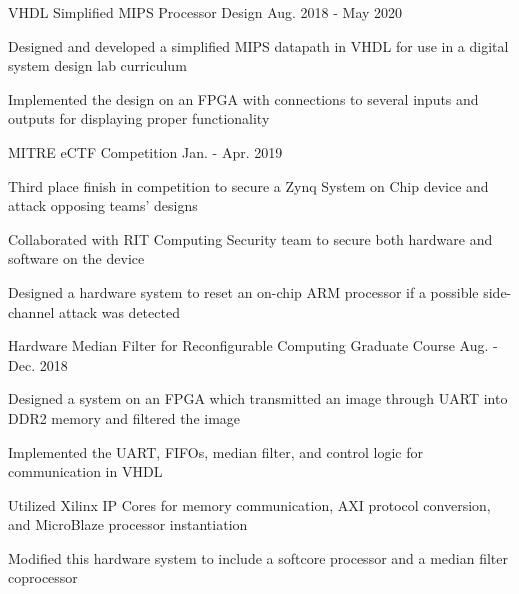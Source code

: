 
\begin{cventries}


	\cvproject
		{VHDL Simplified MIPS Processor Design}
		{Aug. 2018 - May 2020}
		{
			\begin{cvitems}
			\item {Designed and developed a simplified MIPS datapath in VHDL for use in a digital system design lab curriculum}
			\item {Implemented the design on an FPGA with connections to several inputs and outputs for displaying proper functionality}
			\end{cvitems}
		}

	\cvproject
		{MITRE eCTF Competition}
		{Jan. - Apr. 2019}
		{
			\begin{cvitems}
			\item {Third place finish in competition to secure a Zynq System on Chip device and attack opposing teams' designs}
			\item {Collaborated with RIT Computing Security team to secure both hardware and software on the device}
			\item {Designed a hardware system to reset an on-chip ARM processor if a possible side-channel attack was detected}
			\end{cvitems}
		}

	\cvproject
		{Hardware Median Filter for Reconfigurable Computing Graduate Course}
		{Aug. - Dec. 2018}
		{
			\begin{cvitems}
			\item {Designed a system on an FPGA which transmitted an image through UART into DDR2 memory and filtered the image}
			\item {Implemented the UART, FIFOs, median filter, and control logic for communication in VHDL}
			\item {Utilized Xilinx IP Cores for memory communication, AXI protocol conversion, and MicroBlaze processor instantiation}
			\item {Modified this hardware system to include a softcore processor and a median filter coprocessor}
			\end{cvitems}
		}


\end{cventries}
